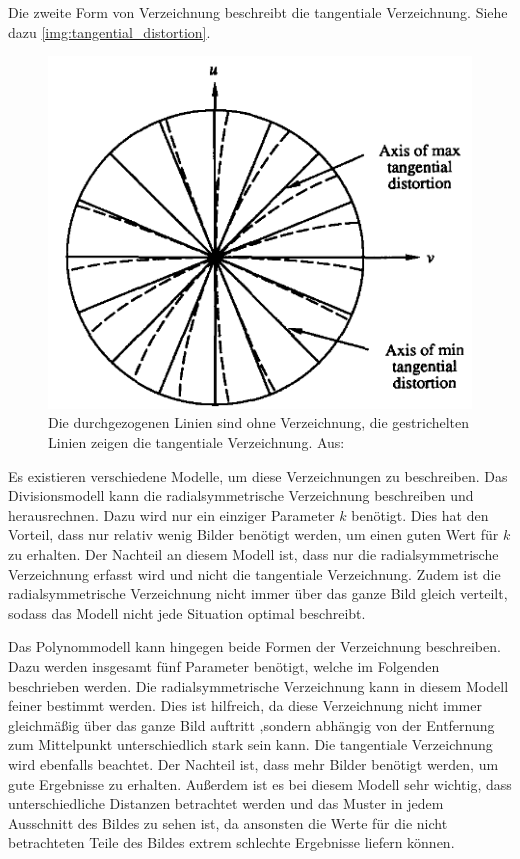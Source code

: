 Die zweite Form von Verzeichnung beschreibt die tangentiale Verzeichnung. Siehe dazu \autoref{img:tangential_distortion}.
\begin{figure}[!hbt]
	\centering
	\vspace{1ex}
	\includegraphics[scale=0.5]{../images/tangential_distortion}
	\caption[Die durchgezogenen Linien sind ohne Verzeichnung, die gestrichelten Linien zeigen die tangentiale Verzeichnung. Aus: \cite{tangential_distortion}]{\label{img:tangential_distortion}Die durchgezogenen Linien sind ohne Verzeichnung, die gestrichelten Linien zeigen die tangentiale Verzeichnung. Aus: \cite{tangential_distortion}}
	\vspace{1ex}
\end{figure}

Es existieren verschiedene Modelle, um diese Verzeichnungen zu beschreiben. Das Divisionsmodell kann die radialsymmetrische Verzeichnung beschreiben und herausrechnen. Dazu wird nur ein einziger Parameter $k$ benötigt. Dies hat den Vorteil, dass nur relativ wenig Bilder benötigt werden, um einen guten Wert für $k$ zu erhalten. Der Nachteil an diesem Modell ist, dass nur die radialsymmetrische Verzeichnung erfasst wird und nicht die tangentiale Verzeichnung. Zudem ist die radialsymmetrische Verzeichnung nicht immer über das ganze Bild gleich verteilt, sodass das Modell nicht jede Situation optimal beschreibt.

Das Polynommodell kann hingegen beide Formen der Verzeichnung beschreiben. Dazu werden insgesamt fünf Parameter benötigt, welche im Folgenden beschrieben werden. Die radialsymmetrische Verzeichnung kann in diesem Modell feiner bestimmt werden. Dies ist hilfreich, da diese Verzeichnung nicht immer gleichmäßig über das ganze Bild auftritt ,sondern abhängig von der Entfernung zum Mittelpunkt unterschiedlich stark sein kann. Die tangentiale Verzeichnung wird ebenfalls beachtet. Der Nachteil ist, dass mehr Bilder benötigt werden, um gute Ergebnisse zu erhalten. Außerdem ist es bei diesem Modell sehr wichtig, dass unterschiedliche Distanzen betrachtet werden und das Muster in jedem Ausschnitt des Bildes zu sehen ist, da ansonsten die Werte für die nicht betrachteten Teile des Bildes extrem schlechte Ergebnisse liefern können.

